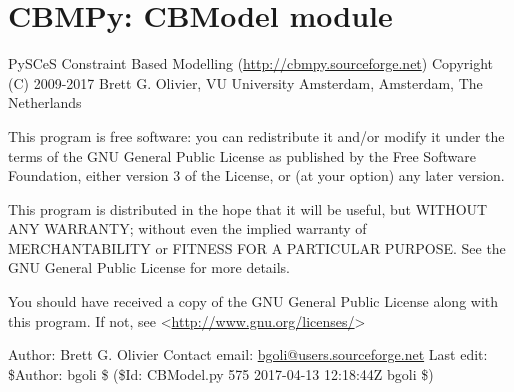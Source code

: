 \documentclass[a4paper,11pt,english]{sphinxmanual}
\begin{document}
\label{modules_doc:module-cbmpy.CBModel}

\section{CBMPy: CBModel module}
\label{modules_doc:cbmpy-cbmodel-module}
PySCeS Constraint Based Modelling (\url{http://cbmpy.sourceforge.net})
Copyright (C) 2009-2017 Brett G. Olivier, VU University Amsterdam, Amsterdam, The Netherlands

This program is free software: you can redistribute it and/or modify
it under the terms of the GNU General Public License as published by
the Free Software Foundation, either version 3 of the License, or
(at your option) any later version.

This program is distributed in the hope that it will be useful,
but WITHOUT ANY WARRANTY; without even the implied warranty of
MERCHANTABILITY or FITNESS FOR A PARTICULAR PURPOSE.  See the
GNU General Public License for more details.

You should have received a copy of the GNU General Public License
along with this program.  If not, see \textless{}\url{http://www.gnu.org/licenses/}\textgreater{}

Author: Brett G. Olivier
Contact email: \href{mailto:bgoli@users.sourceforge.net}{bgoli@users.sourceforge.net}
Last edit: \$Author: bgoli \$ (\$Id: CBModel.py 575 2017-04-13 12:18:44Z bgoli \$)
\end{document}
